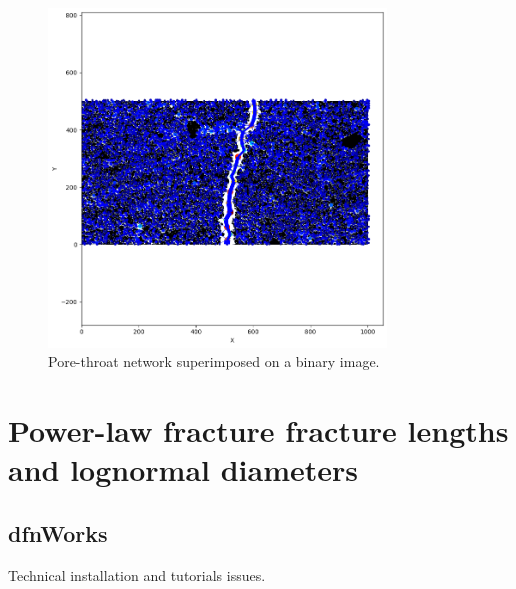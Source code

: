 \documentclass{article}
\begin{document}
\begin{figure}[htbp]
    \centering
    \includegraphics[width=0.8\textwidth]{images/digitalRocks/fractureNetwork.png}
    \caption{Pore-throat network superimposed on a binary image.}
    \label{fig:FractureNet}
\end{figure}

\FloatBarrier  %
\section{Power-law fracture fracture lengths and lognormal diameters}

\FloatBarrier  %
\subsection{dfnWorks}
Technical installation and tutorials issues.

\FloatBarrier  %
\end{document}
